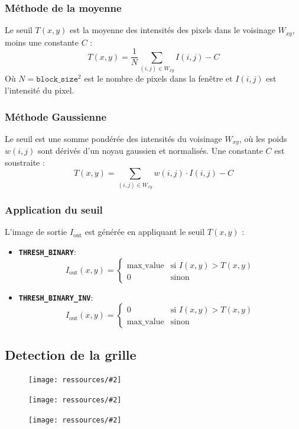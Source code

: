 \documentclass{article}
\newcommand{\stepimage}[3][0.3\textwidth]{%
  \minipage{#1}
    \texttt{[image: ressources/\#2]}
    \caption{#3}
  \endminipage\hfill
}
\begin{document}
\subsubsection{Méthode de la moyenne}
Le seuil \(T(x, y)\) est la moyenne des intensités des pixels dans le voisinage \(W_{xy}\), moins une constante \(C\) :
\[
T(x, y) = \frac{1}{N} \sum_{(i, j) \in W_{xy}} I(i, j) - C
\]
Où \(N = \texttt{block\_size}^2\) est le nombre de pixels dans la fenêtre et \(I(i, j)\) est l'intensité du pixel.

\subsubsection{Méthode Gaussienne}
Le seuil est une somme pondérée des intensités du voisinage \(W_{xy}\), où les poids \(w(i, j)\) sont dérivés d'un noyau gaussien et normalisés. Une constante \(C\) est soustraite :
\[
T(x, y) = \sum_{(i, j) \in W_{xy}} w(i, j) \cdot I(i, j) - C
\]

\subsubsection{Application du seuil}
L'image de sortie \(I_{\text{out}}\) est générée en appliquant le seuil \(T(x, y)\) :
\begin{itemize}
    \item \textbf{\texttt{THRESH\_BINARY}}:
    \[
    I_{\text{out}}(x, y) =
    \begin{cases}
    \text{max\_value} & \text{si } I(x, y) > T(x, y) \\
    0 & \text{sinon}
    \end{cases}
    \]
    \item \textbf{\texttt{THRESH\_BINARY\_INV}}:
    \[
    I_{\text{out}}(x, y) =
    \begin{cases}
    0 & \text{si } I(x, y) > T(x, y) \\
    \text{max\_value} & \text{sinon}
    \end{cases}
    \]
\end{itemize}


\subsection{Detection de la grille}
\begin{figure}[!htb]
    \stepimage[0.30\textwidth]{image_1_step_05_grid_extraction.png}{}
    \stepimage[0.30\textwidth]{image_2_step_05_grid_extraction.png}{}
    \stepimage[0.26\textwidth]{image_3_step_05_grid_extraction.png}{}
\end{figure}
\end{document}
